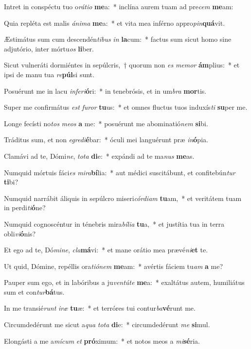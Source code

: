 \item Intret in conspéctu tuo o\textit{rá}\textit{ti}\textit{o} \textbf{me}a:~* inclína aurem tuam ad pre\textit{cem} \textbf{me}am:
\item Quia repléta est malis \textit{á}\textit{ni}\textit{ma} \textbf{me}a:~* et vita mea inférno appro\textit{pin}\textbf{quá}vit.
\item Æstimátus sum cum descendén\textit{ti}\textit{bus} \textit{in} \textbf{la}cum:~* factus sum sicut homo sine adjutório, inter mórtu\textit{os} \textbf{li}ber.
\item Sicut vulneráti dormiéntes in sepúlcris,~† quorum non \textit{es} \textit{me}\textit{mor} \textbf{ám}plius:~* et ipsi de manu tua \textit{re}\textbf{púl}si sunt.
\item Posuérunt me in lacu \textit{in}\textit{fe}\textit{ri}\textbf{ó}ri:~* in tenebrósis, et in um\textit{bra} \textbf{mor}tis.
\item Super me confirmátus \textit{est} \textit{fu}\textit{ror} \textbf{tu}us:~* et omnes fluctus tuos induxís\textit{ti} \textbf{su}per me.
\item Longe fecísti no\textit{tos} \textit{me}\textit{os} \textbf{a} me:~* posuérunt me abominatió\textit{nem} \textbf{si}bi.
\item Tráditus sum, et non \textit{e}\textit{gre}\textit{di}\textbf{é}bar:~* óculi mei languérunt præ \textit{in}\textbf{ó}pia.
\item Clamávi ad te, Dómi\textit{ne}, \textit{to}\textit{ta} \textbf{di}e:~* expándi ad te ma\textit{nus} \textbf{me}as.
\item Numquid mórtuis fáci\textit{es} \textit{mi}\textit{ra}\textbf{bí}lia:~* aut médici suscitábunt, et confitebún\textit{tur} \textbf{ti}bi?
\item Numquid narrábit áliquis in sepúlcro miseri\textit{cór}\textit{di}\textit{am} \textbf{tu}am,~* et veritátem tuam in perdi\textit{ti}\textbf{ó}ne?
\item Numquid cognoscéntur in ténebris mira\textit{bí}\textit{li}\textit{a} \textbf{tu}a,~* et justítia tua in terra obli\textit{vi}\textbf{ó}nis?
\item Et ego ad te, Dó\textit{mi}\textit{ne}, \textit{cla}\textbf{má}vi:~* et mane orátio mea prævé\textit{ni}\textbf{et} te.
\item Ut quid, Dómine, repéllis ora\textit{ti}\textit{ó}\textit{nem} \textbf{me}am:~* avértis fáciem tu\textit{am} \textbf{a} me?
\item Pauper sum ego, et in labóribus a ju\textit{ven}\textit{tú}\textit{te} \textbf{me}a:~* exaltátus autem, humiliátus sum et con\textit{tur}\textbf{bá}tus.
\item In me transié\textit{runt} \textit{i}\textit{ræ} \textbf{tu}æ:~* et terróres tui contur\textit{ba}\textbf{vé}runt me.
\item Circumdedérunt me sicut a\textit{qua} \textit{to}\textit{ta} \textbf{di}e:~* circumdedérunt \textit{me} \textbf{si}mul.
\item Elongásti a me a\textit{mí}\textit{cum} \textit{et} \textbf{pró}ximum:~* et notos meos a \textit{mi}\textbf{sé}ria.

